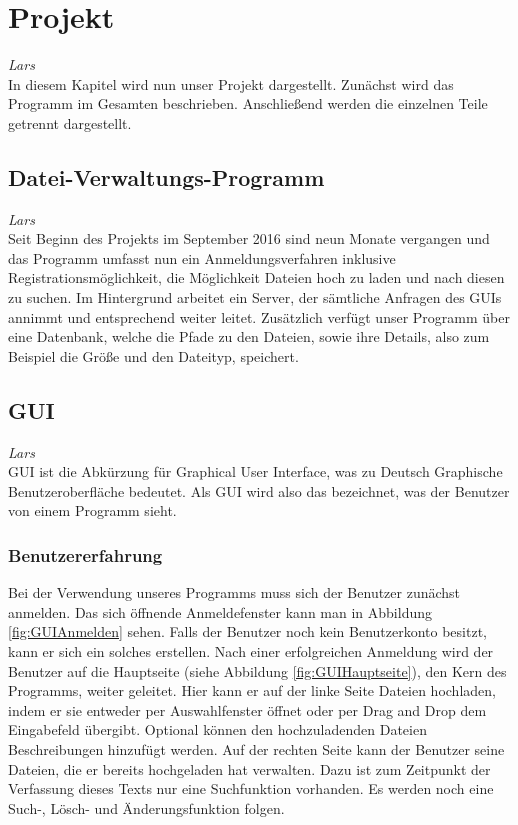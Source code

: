 \documentclass[12pt,a4paper,bibliography=totocnumbered,listof=totocnumbered]{scrartcl}
\begin{document}
\begin{minipage}{\linewidth}
\section{Projekt}
\label{sec:Projekt}
\emph{Lars}\\
In diesem Kapitel wird nun unser Projekt dargestellt. Zunächst wird das Programm im Gesamten beschrieben. Anschließend werden die einzelnen Teile getrennt dargestellt.

\subsection{Datei-Verwaltungs-Programm}
\emph{Lars}\\
Seit Beginn des Projekts im September 2016 sind neun Monate vergangen und das Programm umfasst nun ein Anmeldungsverfahren inklusive Registrationsmöglichkeit, die Möglichkeit Dateien hoch zu laden und nach diesen zu suchen. Im Hintergrund arbeitet ein Server, der sämtliche Anfragen des GUIs annimmt und entsprechend weiter leitet. Zusätzlich verfügt unser Programm über eine Datenbank, welche die Pfade zu den Dateien, sowie ihre Details, also zum Beispiel die Größe und den Dateityp, speichert.

\subsection{GUI}
\label{GUI}
\emph{Lars}\\
GUI ist die Abkürzung für \glqq Graphical User Interface\grqq , was zu Deutsch \glqq Graphische Benutzeroberfläche\grqq{} bedeutet. Als GUI wird also das bezeichnet, was der Benutzer von einem Programm sieht. \\

\subsubsection{Benutzererfahrung}
\label{Benutzererfahrung}
Bei der Verwendung unseres Programms muss sich der Benutzer zunächst anmelden. Das sich öffnende Anmeldefenster kann man in Abbildung \ref{fig:GUIAnmelden} sehen. Falls der Benutzer noch kein Benutzerkonto besitzt, kann er sich ein solches erstellen. Nach einer erfolgreichen Anmeldung wird der Benutzer auf die Hauptseite (siehe Abbildung \ref{fig:GUIHauptseite}), den Kern des Programms, weiter geleitet. Hier kann er auf der linke Seite Dateien hochladen, indem er sie entweder per Auswahlfenster öffnet oder per Drag and Drop dem Eingabefeld übergibt. Optional können den hochzuladenden Dateien Beschreibungen hinzufügt werden. Auf der rechten Seite kann der Benutzer seine Dateien, die er bereits hochgeladen hat verwalten. Dazu ist zum Zeitpunkt der Verfassung dieses Texts nur eine Suchfunktion vorhanden. Es werden noch eine Such-, Lösch- und Änderungsfunktion folgen.\\


\end{minipage}
\end{document}
